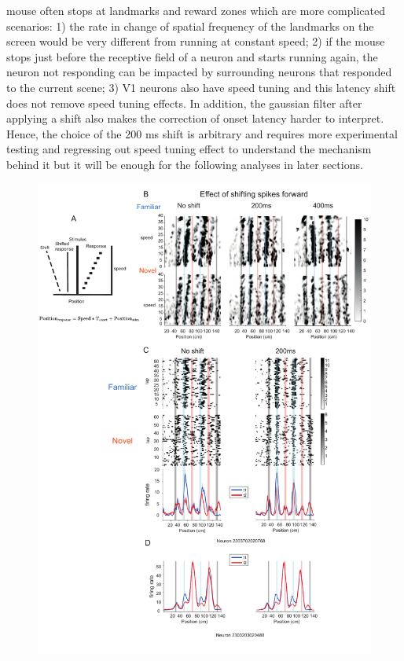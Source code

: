 mouse often stops at landmarks and reward zones which are more complicated scenarios: 1) the rate in change of spatial frequency of the landmarks on the screen would be very different from running at constant speed; 2) if the mouse stops just before the receptive field of a neuron and starts running again, the neuron not responding can be impacted by surrounding neurons that responded to the current scene; 3) V1 neurons also have speed tuning and this latency shift does not remove speed tuning effects. In addition, the gaussian filter after applying a shift also makes the correction of onset latency harder to interpret. Hence, the choice of the 200 ms shift is arbitrary and requires more experimental testing and regressing out speed tuning effect to understand the mechanism behind it but it will be enough for the following analyses in later sections.
\begin{figure}
    \centering
    \includegraphics[width=1\linewidth]{figures//Chapter 4 V1/fig2_speed_impact.pdf}

\end{figure}
